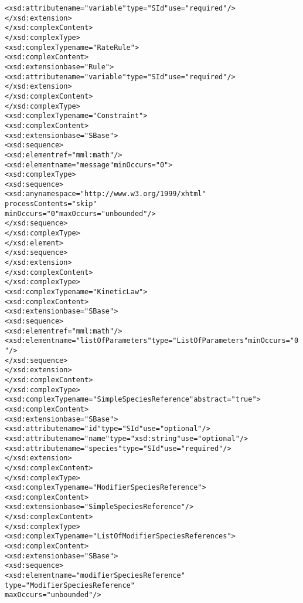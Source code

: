 \begin{alltt}
                <xsd:attribute name="variable" type="SId" use="required"/>
            </xsd:extension>
        </xsd:complexContent>
    </xsd:complexType>
    <xsd:complexType name="RateRule">
        <xsd:complexContent>
            <xsd:extension base="Rule">
                <xsd:attribute name="variable" type="SId" use="required"/>
            </xsd:extension>
        </xsd:complexContent>
    </xsd:complexType>
    <xsd:complexType name="Constraint">
        <xsd:complexContent>
            <xsd:extension base="SBase">
                <xsd:sequence>
                    <xsd:element ref="mml:math"/>
                    <xsd:element name="message" minOccurs="0">
                        <xsd:complexType>
                            <xsd:sequence>
                                <xsd:any namespace="http://www.w3.org/1999/xhtml" 
                                         processContents="skip" 
                                         minOccurs="0" maxOccurs="unbounded"/>
                            </xsd:sequence>
                        </xsd:complexType>
                    </xsd:element>
                </xsd:sequence>
            </xsd:extension>
        </xsd:complexContent>
    </xsd:complexType>
    <xsd:complexType name="KineticLaw">
        <xsd:complexContent>
            <xsd:extension base="SBase">
                <xsd:sequence>
                    <xsd:element ref="mml:math"/>
                    <xsd:element name="listOfParameters" type="ListOfParameters" minOccurs="0"/>
                </xsd:sequence>
            </xsd:extension>
        </xsd:complexContent>
    </xsd:complexType>
    <xsd:complexType name="SimpleSpeciesReference" abstract="true">
        <xsd:complexContent>
            <xsd:extension base="SBase">
                <xsd:attribute name="id" type="SId" use="optional"/>
                <xsd:attribute name="name" type="xsd:string" use="optional"/>
                <xsd:attribute name="species" type="SId" use="required"/>
            </xsd:extension>
        </xsd:complexContent>
    </xsd:complexType>
    <xsd:complexType name="ModifierSpeciesReference">
        <xsd:complexContent>
            <xsd:extension base="SimpleSpeciesReference"/>
        </xsd:complexContent>
    </xsd:complexType>
    <xsd:complexType name="ListOfModifierSpeciesReferences">
        <xsd:complexContent>
            <xsd:extension base="SBase">
                <xsd:sequence>
                    <xsd:element name="modifierSpeciesReference" 
                                 type="ModifierSpeciesReference" 
                                 maxOccurs="unbounded"/>

\end{alltt}
